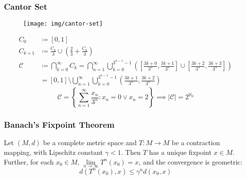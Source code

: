 \documentclass[UTF8,11pt,colorlinks,compress,openany]{beamer}%
\begin{document}
\begin{frame}\frametitle{Cantor Set}
	\begin{center}
		\begin{figure}
			\texttt{[image: img/cantor-set]}
		\end{figure}
	\end{center}
	\begin{align*}
	C_0&\coloneqq [0,1]\\
	C_{k+1}&\coloneqq {\frac {C_k}{3}}\cup \left({\frac {2}{3}}+{\frac {C_k}{3}}\right)\\
	\mathcal{C}&\coloneqq \bigcap\limits_{k=0}^\infty C_k=
	\bigcap\limits_{n=1}^\infty\bigcup\limits_{k=0}^{3^{n-1}-1}\left(\left[{\frac{3k+0}{3^{n}}},{\frac{3k+1}{3^{n}}}\right]\cup \left[{\frac {3k+2}{3^{n}}},{\frac {3k+3}{3^{n}}}\right]\right)\\
	&=[0,1]\setminus\bigcup\limits_{n=1}^\infty\bigcup\limits_{k=0}^{3^{n-1}-1}\left({\frac{3k+1}{3^{n}}},{\frac {3k+2}{3^{n}}}\right)
	\end{align*}
	\[\mathcal{C}=\left\{\sum\limits_{n=1}^\infty\frac{x_n}{3^n}: x_n=0\vee x_n=2\right\}\implies |\mathcal{C}|=2^{\aleph_0}\]
\end{frame}

\begin{frame}\frametitle{Banach's Fixpoint Theorem}
	\begin{theorem}
		Let $(M,d)$ be a complete metric space and $T: M\to M$ be a contraction mapping, with Lipschitz constant $\gamma<1$. Then $T$ has a unique fixpoint $x\in M$. Further, for each $x_0\in M$, $\lim\limits_{n\to\infty}T^n(x_0)=x$, and the convergence is geometric:
		\[d(T^n(x_0),x)\leq\gamma^n d(x_0,x)\]
	\end{theorem}
\end{frame}
\end{document}

